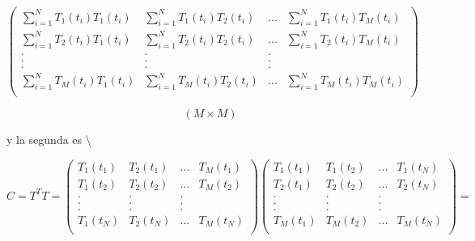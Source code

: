 \documentclass[
]{agujournal2019}
\begin{document}
\begin{equation}
\left(\begin{array}{cccc}
   \sum\limits_{i=1}^N{T_{1}(t_i)T_{1}(t_i)} & \sum\limits_{i=1}^N{T_{1}(t_i)T_{2}(t_i)} 
   & ... & \sum\limits_{i=1}^N{T_{1}(t_i)T_{M}(t_i)}\\
   \sum\limits_{i=1}^N{T_{2}(t_i)T_{1}(t_i)} & \sum\limits_{i=1}^N{T_{2}(t_i)T_{2}(t_i)} 
   & ... & \sum\limits_{i=1}^N{T_{2}(t_i)T_{M}(t_i)}\\
        . & . & . \\
        . & . & . \\
        . & . & . \\
   \sum\limits_{i=1}^N{T_{M}(t_i)T_{1}(t_i)} & \sum\limits_{i=1}^N{T_{M}(t_i)T_{2}(t_i)} 
   & ... & \sum\limits_{i=1}^N{T_{M}(t_i)T_{M}(t_i)}\\
   \end{array}\right)
  \end{equation}

\[\left( M \times M \right)\]

y la segunda es \textbackslash{}

\begin{equation}
 C={T}^T{T}=\left(\begin{array}{cccc}
   T_{1}(t_1) & T_{2}(t_1) & ... & T_{M}(t_1) \\
   T_{1}(t_2) & T_{2}(t_2) & ... & T_{M}(t_2) \\
        . & . & . \\
        . & . & . \\
        . & . & . \\
   T_{1}(t_N) & T_{2}(t_N) & ... & T_{M}(t_N)\\
        \end{array}\right)
\left(\begin{array}{cccc}
   T_{1}(t_1) & T_{1}(t_2) & ... & T_{1}(t_N)\\
   T_{2}(t_1) & T_{2}(t_2) & ... & T_{2}(t_N)\\
        . & . & . \\
        . & . & . \\
        . & . & . \\
   T_{M}(t_1) & T_{M}(t_2) & ... & T_{M}(t_N)\\
\end{array}\right)= 
\end{equation}
\end{document}
